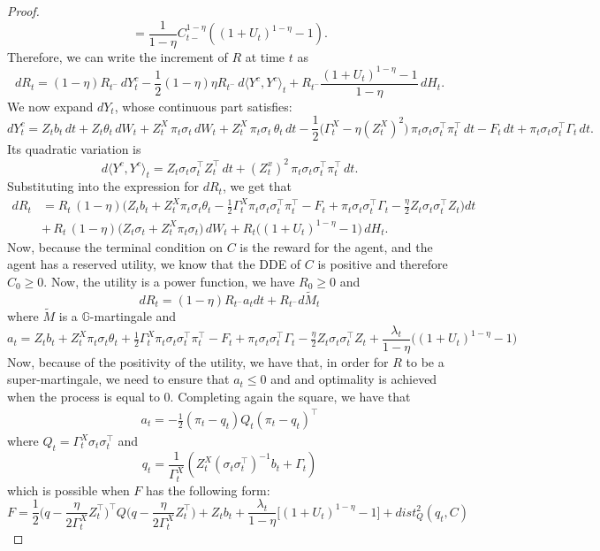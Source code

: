 \documentclass[11pt,a4paper]{article}
\theoremstyle{thmstyleone}%
\theoremstyle{thmstyletwo}%
\theoremstyle{thmstylethree}%
\newcommand{\G}{\mathbb{G}}
\begin{document}
\begin{proof}
\[    = \frac{1}{1-\eta} C_{t-}^{1-\eta} \left( (1 + U_t)^{1-\eta} - 1 \right).
    \]
    Therefore, we can write the increment of $R$ at time $t$ as
    \[
    dR_t = (1-\eta) R_{t^-}\, dY_t^c
        - \frac{1}{2}(1-\eta)\eta R_{t^-}\, d\langle Y^c, Y^c\rangle_t
        + R_{t^-} \frac{(1 + U_t)^{1-\eta} - 1}{1-\eta}\, dH_t.
    \]
    We now expand \(dY_t\), whose continuous part satisfies:
    \[
    dY_t^{c}
    = Z_t b_t\,dt
    + Z_t \theta_t\,dW_t
    + Z_t^{X}\,\pi_t \sigma_t\,dW_t
    + Z_t^{X}\,\pi_t \sigma_t\,\theta_t\,dt
    - \frac{1}{2}\big(\Gamma_t^{X} -\eta(Z_t^{X})^{2}\big)\,
      \pi_t \sigma_t \sigma_t^{\top} \pi_t^{\top}\,dt
    - F_t\,dt
    + \pi_t \sigma_t \sigma_t^{\top} \Gamma_t\,dt .
    \]
    Its quadratic variation is
    \[
    d \langle Y^{c}, Y^{c} \rangle_t
    = Z_t \sigma_t \sigma_t^{\top} Z_t^{\top}\,dt
    + (Z_t^{x})^{2}\, \pi_t \sigma_t \sigma_t^{\top} \pi_t^{\top}\,dt .
    \]
    Substituting into the expression for $dR_t$, we get that
    \begin{align*}
        dR_t
        &= R_t \, (1-\eta) \Big(
            Z_t b_t
            + Z_t^{X} \pi_t \sigma_t \theta_t
            - \tfrac{1}{2} \Gamma_t^{X} 
              \pi_t \sigma_t \sigma_t^{\top} \pi_t^{\top}
            - F_t
            + \pi_t \sigma_t \sigma_t^{\top} \Gamma_t - \tfrac{\eta}{2} Z_t \sigma_t \sigma_t^{\top} Z_t
        \Big) dt\\
        &+ \, R_t \, (1-\eta) \big(Z_t \sigma_t + Z_t^{X} \pi_t \sigma_t \big)\, dW_t + R_t \big((1 + U_t)^{1 - \eta} - 1\big)\, dH_t .
    \end{align*}
    Now, because the terminal condition on $C$ is the reward for the agent, and the agent has a reserved utility, we know that the DDE of $C$ is positive and therefore $C_0 \geq 0$. Now, the utility is a power function, we have $R_0 \geq 0$ and
    \[
        dR_t = (1-\eta) R_{t^-} a_t dt +  R_{t^-} d\tilde{M}_t
    \]
    where $\tilde{M}$ is a $\G$-martingale and
    \[
        a_t =
            Z_t b_t
            + Z_t^{X} \pi_t \sigma_t \theta_t
            + \tfrac{1}{2} \Gamma_t^{X} 
              \pi_t \sigma_t \sigma_t^{\top} \pi_t^{\top}
            - F_t
            + \pi_t \sigma_t \sigma_t^{\top} \Gamma_t - \tfrac{\eta}{2} Z_t \sigma_t \sigma_t^{\top} Z_t
            + \frac{\lambda_t}{1-\eta} \big((1 + U_t)^{1-\eta} - 1\big) 
    \]
    Now, because of the positivity of the utility, we have that, in order for $R$ to be a super-martingale, we need to ensure that $a_t \leq 0$ and and optimality is achieved when the process is equal to $0$. Completing again the square, we have that
    \begin{align*}
        a_t = - \frac{1}{2}(\pi_t - q_t) Q_t (\pi_t - q_t)^{\top}
    \end{align*}
        where $Q_t = \Gamma_t^{X}\sigma_t \sigma_t^{\top}$
    and 
    \[
        q_t = \frac{1}{\Gamma^X_t}(Z^X_t (\sigma_t \sigma_t^{\top})^{-1}b_t + \Gamma_t)
    \]
    which is possible when $F$ has the following form:
    \[
        F = \frac12  \Big(q - \frac{\eta}{2\Gamma^X_t}Z_t^{\top} \Big)^{\top} Q \Big(q - \frac{\eta}{2\Gamma^X_t}Z_t^{\top} \Big) +  Z_t b_t + \frac{\lambda_t}{1-\eta}\Big[ (1 + U_t)^{1 - \eta} -1 \Big] + dist^2_Q(q_t, C)
    \]
    \end{proof}
\end{document}
